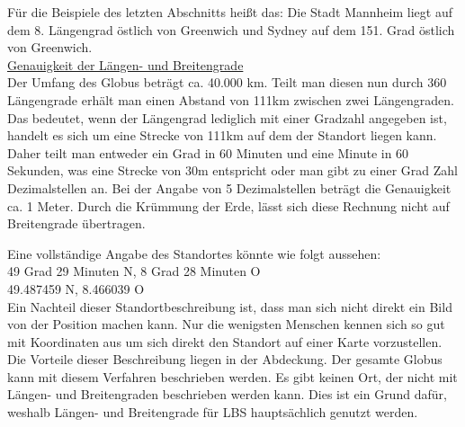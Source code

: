 Für die Beispiele des letzten Abschnitts heißt das: Die Stadt Mannheim liegt auf dem 8. Längengrad östlich von Greenwich und Sydney auf dem 151. Grad östlich von Greenwich.
\\\underline{Genauigkeit der Längen- und Breitengrade}
\\Der Umfang des Globus beträgt ca. 40.000 km. Teilt man diesen nun durch 360 Längengrade erhält man einen Abstand von 111km zwischen zwei Längengraden. Das bedeutet, wenn der Längengrad lediglich mit einer Gradzahl angegeben ist, handelt es sich um eine Strecke von 111km auf dem der Standort liegen kann. Daher teilt man entweder ein Grad in 60 Minuten und eine Minute in 60 Sekunden, was eine Strecke von 30m entspricht oder man gibt zu einer Grad Zahl Dezimalstellen an. Bei der Angabe von 5 Dezimalstellen beträgt die Genauigkeit ca. 1 Meter.
Durch die Krümmung der Erde, lässt sich diese Rechnung nicht auf Breitengrade übertragen.

Eine vollständige Angabe des Standortes könnte wie folgt aussehen:
\\49 Grad 29 Minuten N, 8 Grad 28 Minuten O  
\\49.487459 N, 8.466039 O 
\\Ein Nachteil dieser Standortbeschreibung ist, dass man sich nicht direkt ein Bild von der Position machen kann. Nur die wenigsten Menschen kennen sich so gut mit Koordinaten aus um sich direkt den Standort auf einer Karte vorzustellen.
\\Die Vorteile dieser Beschreibung liegen in der Abdeckung. Der gesamte Globus kann mit diesem Verfahren beschrieben werden. Es gibt keinen Ort, der nicht mit Längen- und Breitengraden beschrieben werden kann. Dies ist ein Grund dafür, weshalb Längen- und Breitengrade für LBS hauptsächlich genutzt werden.
\cite{QuelleGrade}


